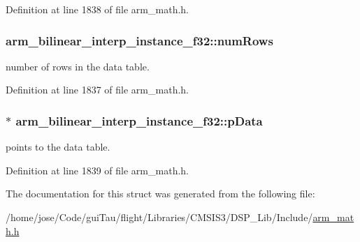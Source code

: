 Definition at line 1838 of file arm\-\_\-math.\-h.

\hypertarget{structarm__bilinear__interp__instance__f32_a34f2b17cc57b95011960df9718af6ed6}{
\subsubsection[{num\-Rows}]{ arm\-\_\-bilinear\-\_\-interp\-\_\-instance\-\_\-f32\-::num\-Rows}}\label{structarm__bilinear__interp__instance__f32_a34f2b17cc57b95011960df9718af6ed6}
number of rows in the data table. 

Definition at line 1837 of file arm\-\_\-math.\-h.

\hypertarget{structarm__bilinear__interp__instance__f32_afd1e764591c991c212d56c893efb5ea4}{
\subsubsection[{p\-Data}]{$\ast$ arm\-\_\-bilinear\-\_\-interp\-\_\-instance\-\_\-f32\-::p\-Data}}\label{structarm__bilinear__interp__instance__f32_afd1e764591c991c212d56c893efb5ea4}
points to the data table. 

Definition at line 1839 of file arm\-\_\-math.\-h.



The documentation for this struct was generated from the following file\-:\begin{DoxyCompactItemize}
\item 
/home/jose/\-Code/gui\-Tau/flight/\-Libraries/\-C\-M\-S\-I\-S3/\-D\-S\-P\-\_\-\-Lib/\-Include/\hyperlink{arm__math_8h}{arm\-\_\-math.\-h}\end{DoxyCompactItemize}

